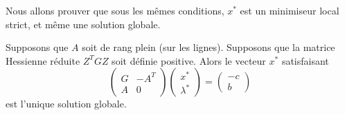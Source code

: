 Nous allons prouver que sous les mêmes conditions, $x^*$ est un minimiseur local strict, et même une solution globale.

\begin{theoreme}
    Supposons que $A$ soit de rang plein (sur les lignes). Supposons que la matrice Hessienne réduite $Z^T G Z$ soit définie positive.
    Alors le vecteur $x^*$ satisfaisant
    \begin{equation}
        \begin{pmatrix}
            G & -A^T \\
            A & 0
        \end{pmatrix}
        \begin{pmatrix}
            x^* \\
            \lambda^*
        \end{pmatrix}
        =
        \begin{pmatrix}
            -c \\
            b
        \end{pmatrix}
    \end{equation}
    est l'unique solution globale.
\end{theoreme}

